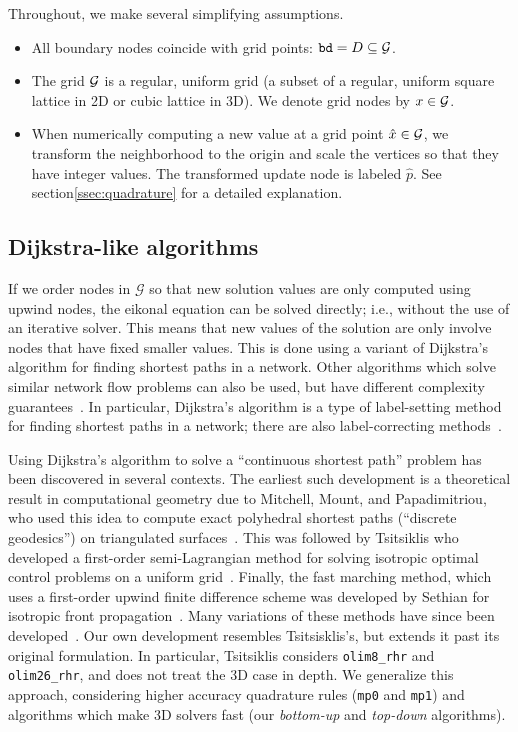 \documentclass[smallcondensed]{svjour3}
\begin{document}
Throughout, we make several simplifying assumptions.
\begin{itemize}
\item All boundary nodes coincide with grid points:
  $\texttt{bd} = D \subseteq \mathcal{G}$.
\item The grid $\mathcal{G}$ is a regular, uniform grid (a subset of a
  regular, uniform square lattice in 2D or cubic lattice in 3D). We
  denote grid nodes by $x \in \mathcal{G}$.
\item When numerically computing a new value at a grid point
  $\hat{x} \in \mathcal{G}$, we transform the neighborhood to the origin and
  scale the vertices so that they have integer values. The transformed
  update node is labeled $\hat{p}$. See section\@ \ref{ssec:quadrature}
  for a detailed explanation.
\end{itemize}

\subsection{Dijkstra-like algorithms}\label{ssec:dijkstra-like}
If we order nodes in $\mathcal{G}$ so that new solution values are
only computed using upwind nodes, the eikonal equation can be solved
directly; i.e., without the use of an iterative solver. This means
that new values of the solution are only involve nodes that have fixed
smaller values. This is done using a variant of Dijkstra's algorithm
for finding shortest paths in a network. Other algorithms which solve
similar network flow problems can also be used, but have different
complexity guarantees~\cite{chacon2012fast}. In particular, Dijkstra's
algorithm is a type of label-setting method for finding shortest paths
in a network; there are also label-correcting
methods~\cite{bertsekas1998network}.

Using Dijkstra's algorithm to solve a ``continuous shortest path''
problem has been discovered in several contexts. The earliest such
development is a theoretical result in computational geometry due to
Mitchell, Mount, and Papadimitriou, who used this idea to compute
exact polyhedral shortest paths (``discrete geodesics'') on
triangulated surfaces~\cite{mitchell1987discrete}. This was followed
by Tsitsiklis who developed a first-order semi-Lagrangian method for
solving isotropic optimal control problems on a uniform
grid~\cite{tsitsiklis1995efficient}. Finally, the fast marching
method, which uses a first-order upwind finite difference scheme was
developed by Sethian for isotropic front
propagation~\cite{sethian1996fast}. Many variations of these methods
have since been
developed~\cite{sethian2003ordered,kao2008legendre}. Our own
development resembles Tsitsisklis's, but extends it past its original
formulation. In particular, Tsitsiklis considers \texttt{olim8\_rhr}
and \texttt{olim26\_rhr}, and does not treat the 3D case in depth. We
generalize this approach, considering higher accuracy quadrature rules
(\texttt{mp0} and \texttt{mp1}) and algorithms which make 3D solvers
fast (our \emph{bottom-up} and \emph{top-down} algorithms).
\end{document}
